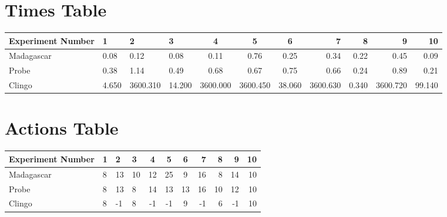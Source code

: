 \documentclass[8pt]{article}
\begin{document}
\begin{landscape}
\section{Times Table}\begin{tabular}{ | l | l | l | l | c | c | c | r | r | r | r | }\hline
Experiment Number & 1 & 2 & 3 & 4 & 5 & 6 & 7 & 8 & 9 & 10\\  \hline
Madagascar & 0.08 & 0.12 & 0.08 & 0.11 & 0.76 & 0.25 & 0.34 & 0.22 & 0.45 & 0.09\\  \hline
Probe & 0.38 & 1.14 & 0.49 & 0.68 & 0.67 & 0.75 & 0.66 & 0.24 & 0.89 & 0.21\\  \hline
Clingo & 4.650 & 3600.310 & 14.200 & 3600.000 & 3600.450 & 38.060 & 3600.630 & 0.340 & 3600.720 & 99.140\\  \hline
\end{tabular}
\section{Actions Table}\begin{tabular}{ | l | l | l | l | c | c | c | r | r | r | r | }\hline
Experiment Number & 1 & 2 & 3 & 4 & 5 & 6 & 7 & 8 & 9 & 10\\ \hline
 Madagascar & 8 & 13 & 10 & 12 & 25 & 9 & 16 & 8 & 14 & 10\\ \hline
 Probe & 8 & 13 & 8 & 14 & 13 & 13 & 16 & 10 & 12 & 10\\ \hline
 Clingo & 8 & -1 & 8 & -1 & -1 & 9 & -1 & 6 & -1 & 10\\ \hline
\end{tabular}
\end{landscape}
\end{document}

